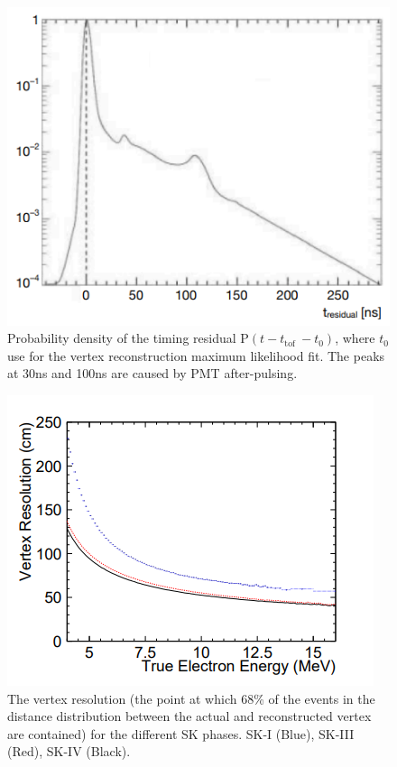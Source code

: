 \begin{figure}
    \includegraphics[width=\textwidth]{Figures/bonsai_pdf_res.png}
\caption{Probability density of the timing residual P$(t-t_{\text {tof }}-t_{0})$, where $t_{0}$ use for the vertex reconstruction maximum likelihood fit. The peaks at 30ns and 100ns are caused by PMT after-pulsing.}
    \label{fig:bonsaivertexres}
\end{figure}

\begin{figure}
    \includegraphics[width=\textwidth]{Figures/bonsai_vertex_res.png}
\caption{The vertex resolution (the point at which 68\% of the events in the distance distribution between the actual and reconstructed vertex are contained) for the different SK phases. SK-I (Blue), SK-III (Red), SK-IV (Black).}
    \label{bonsaivertexres}
\end{figure}

